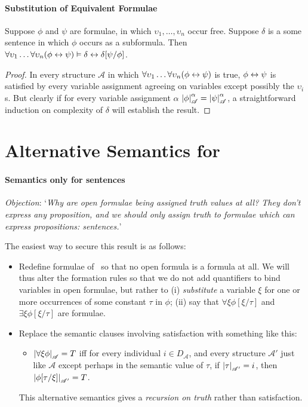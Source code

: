 \paragraph{Substitution of Equivalent Formulae}

\begin{theorem}
	Suppose $\phi$ and $\psi$ are formulae, in which $\upsilon_{1},\ldots,\upsilon_{n}$ occur free. Suppose $\delta$ is a some sentence in which $\phi$ occurs as a subformula. Then $\forall\upsilon_{1}\ldots\forall\upsilon_{n}(\phi\leftrightarrow\psi)\vDash \delta \leftrightarrow \delta[\psi/\phi]$. \begin{proof}
In every structure $\mathscr{A}$ in which $\forall\upsilon_{1}\ldots\forall\upsilon_{n}(\phi\leftrightarrow\psi)$ is true, $\phi\leftrightarrow\psi$ is satisfied by every variable assignment agreeing on variables except possibly the $\upsilon_{i}$s.  But clearly if for every variable assignment $\alpha$ $\left|\phi\right|^{\alpha}_{\mathscr{A}}=\left|\psi\right|^{\alpha}_{\mathscr{A}}$, a straightforward induction on complexity of $\delta$ will establish the result.
	\end{proof}
\end{theorem}




\section{Alternative Semantics for \ltwo}
\paragraph{Semantics only for sentences}

\emph{Objection}: `\emph{Why are open formulae being assigned truth values at all? They don't express any proposition, and we should only assign truth to formulae which can express propositions: sentences.}'

The easiest way to secure this result is as follows: \begin{itemize}
	\item  Redefine formulae of \ltwo\ so that no open formula is a formula at all. We will thus alter the formation rules so that we do not add quantifiers to bind variables in open formulae, but rather to (i) \emph{substitute} a variable $\xi$ for one
or more occurrences of some constant $\tau$ in $\phi$; (ii) say that $\forall\xi\phi[\xi/\tau]$ and $\exists\xi\phi[\xi/\tau]$ are formulae.
\item Replace the semantic clauses involving satisfaction with something like this:
\begin{itemize}\item $\left|\forall\xi \phi\right|_{\mathscr{A}} = T$  iff  for every
	individual $i \in D_{\mathscr{A}}$, and every structure $\mathscr{A}'$ just like $\mathscr{A}$ except perhaps in the semantic value of $\tau$,
	if $\left|\tau\right|_{\mathscr{A'}}=i$, then $\left|\phi[\tau/\xi]\right|_{\mathscr{A'}}=T$.
\end{itemize}
This alternative semantics gives a \emph{recursion on truth} \label{fiverectr} rather than satisfaction.
\end{itemize}

